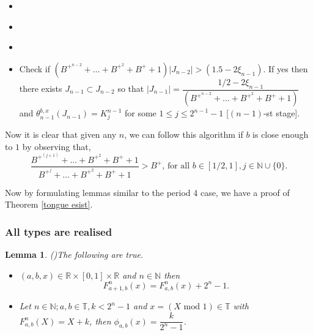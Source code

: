 \documentclass[12pt]{amsart}
\numberwithin{equation}{section}
\newtheorem{lemma}[theorem]{Lemma}
\theoremstyle{remark}
\begin{document}
    \small{
    \begin{itemize}
        \item [\textbf{.}]
    \end{itemize}
     \begin{itemize}
        \item [\textbf{.}]
    \end{itemize}
     \begin{itemize}
        \item [\textbf{.}]
    \end{itemize}
   
    \begin{itemize}
    \item Check if  $(B^{+^{n-2}}+\ldots+B^{+^{2}}+B^++1)|J_{n-2}|>(1.5-2\xi_{n-1})$. If yes then there exists $J_{n-1}\subset J_{n-2}$ so that  $|J_{n-1}|=\dfrac{1/2-2\xi_{n-1}}{(B^{+^{n-2}}+\ldots+B^{+^{2}}+B^++1)}$ and $\theta_{n-1}^{b,x}(J_{n-1})=K_j^{n-1}$ for some $1 \leq j \leq 2^{n-1}-1$  [$(n-1)$-st stage].
   
    
\end{itemize}
\vspace{.5cm}

Now it is clear that given any $n$, we can follow this algorithm if $b$ is close enough to $1$ by observing that,
\[
\dfrac{B^{+^{(j+1)}}+...+B^{+^{2}}+B^++1}{B^{+^{j}}+...+B^{+^{2}}+B^++1}>B^+ \text{, for all } b \in [1/2,1], j \in \mathbb{N} \cup \{0\}.
\]
    


 Now by formulating lemmas similar to the period 4 case, we have a proof of  Theorem \ref{tongue esist}.




\subsubsection{\textbf{All types are realised}}
\vspace{.4cm}

\begin{lemma}(\cite{D})\label{for all types} The following are true.
    \begin{itemize}
        \item $(a,b,x) \in \mathbb{R}\times [0,1]\times\mathbb{R}$ and $n\in \mathbb{N}$ then
    \[
    F_{a+1,b}^n(x)=F_{a,b}^n(x)+2^n-1.
    \]
    \item Let $n \in\mathbb{N}; a,b \in \mathbb{T}, k <2^n-1$ and $x=(X \text{ mod }1) \in \mathbb{T}$ with  $F^n_{a,b}(X)=X+k$, then $\phi_{a,b}(x)=\dfrac{k}{2^n-1}$.
    \end{itemize}
   

\end{lemma}}
\end{document}
